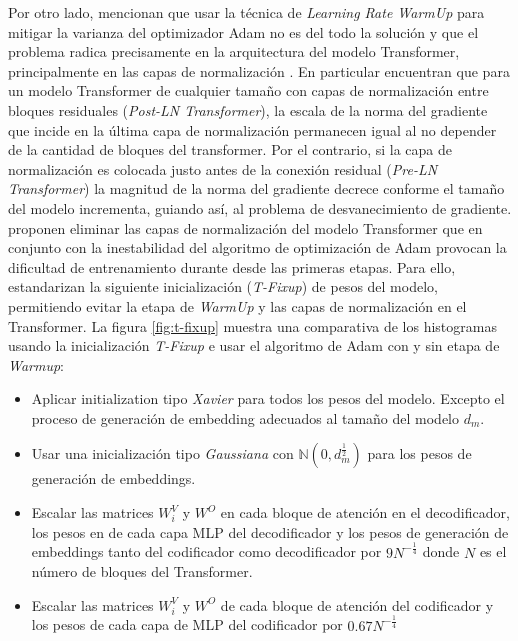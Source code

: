 Por otro lado, \citeauthor*{pmlr-v119-huang20f} mencionan que usar la técnica de \textit{Learning Rate WarmUp}
para mitigar la varianza del optimizador Adam no es del todo la solución y que el problema radica
precisamente en la arquitectura del modelo Transformer, principalmente en las capas de normalización
\cite{DBLP:journals/corr/abs-1804-09849} \cite{DBLP:journals/corr/abs-2002-04745}. En particular
\citeauthor*{DBLP:journals/corr/abs-2002-04745} encuentran que para un modelo Transformer de cualquier
tamaño con capas de normalización entre bloques residuales (\textit{Post-LN Transformer}), la escala
de la norma del gradiente que incide en la última capa de normalización permanecen igual al no depender
de la cantidad de bloques del transformer. Por el contrario, si la capa de normalización es colocada
justo antes de la conexión residual (\textit{Pre-LN Transformer}) la magnitud de la norma del
gradiente decrece conforme el tamaño del modelo incrementa, guiando así, al problema de desvanecimiento de
gradiente. \citeauthor*{pmlr-v119-huang20f} proponen eliminar las capas de normalización del modelo
Transformer que en conjunto con la inestabilidad del algoritmo de optimización de Adam provocan la
dificultad de entrenamiento durante desde las primeras etapas. Para ello, estandarizan la siguiente
inicialización (\textit{T-Fixup}) de pesos del modelo, permitiendo evitar la etapa de \textit{WarmUp}
y las capas de normalización en el Transformer. La figura \ref{fig:t-fixup} muestra una comparativa
de los histogramas usando la inicialización \textit{T-Fixup} e usar el algoritmo de Adam con y sin
etapa de \textit{Warmup}:

\begin{itemize}
    \item Aplicar initialization tipo \textit{Xavier} para todos los pesos del modelo.
          Excepto el proceso de generación de embedding adecuados al tamaño del modelo $d_m$.
    \item Usar una inicialización tipo \textit{Gaussiana} con $\mathbb{N}(0, d_m^\frac{1}{2})$ para
          los pesos de generación de embeddings.
    \item Escalar las matrices $W_i^V$ y $W^O$ en cada bloque de atención en el decodificador, los
          pesos en de cada capa MLP del decodificador y los pesos de generación de embeddings tanto
          del codificador como decodificador por $9N^{-\frac{1}{4}}$ donde $N$ es el número de bloques
          del Transformer.
    \item Escalar las matrices $W_i^V$ y $W^O$ de cada bloque de atención del codificador y los pesos
          de cada capa de MLP del codificador por $0.67N^{-\frac{1}{4}}$
\end{itemize}

